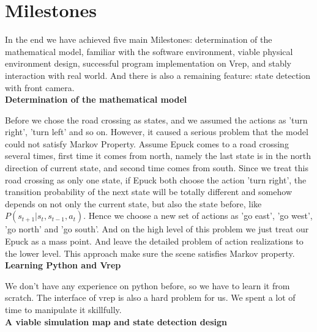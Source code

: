 \documentclass[a4paper, 11pt]{article} %
\begin{document}
\section{Milestones}
In the end we have achieved five main Milestones: determination of the mathematical
model, familiar with the software environment, viable physical environment design,
successful program implementation on Vrep, and stably interaction with real world.
And there is also a remaining feature: state detection with front camera.
\\[3ex]
\textbf{Determination of the mathematical model}

Before we
chose the road crossing as states, and we assumed the actions as 'turn right',
'turn left' and so on. However, it caused a serious problem that the model
could not satisfy Markov Property. Assume Epuck comes to a road crossing
several times, first time it comes from north, namely the last state is in the
north direction of current state, and second time comes from south. Since
we treat this road crossing as only one state, if Epuck both choose the action
'turn right', the transition probability of the next state will be totally different
and somehow depends on not only the current state, but also the state
before, like $P(s_{t+1}|s_t, s_{t-1}, a_t)$. Hence we choose a new set of actions
as 'go east', 'go west', 'go north' and 'go south'. And on the high level of
this problem we just treat our Epuck as a mass point. And leave the detailed
problem of action realizations to the lower level. This approach make sure the
scene satisfies Markov property.
\\[3ex]
\textbf{Learning Python and Vrep }

We don't have any experience on
python before, so we have to learn it from scratch. The interface of vrep is also
a hard problem for us. We spent a lot of time to manipulate it skillfully.
\\[3ex]
\textbf{A viable simulation map and state detection design}
\end{document}
